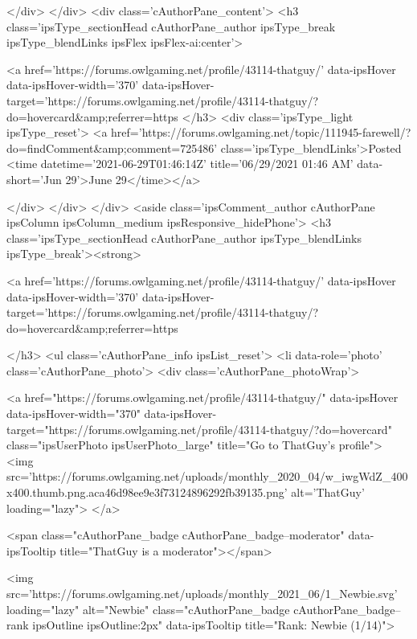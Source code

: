 			</div>
		</div>
		<div class='cAuthorPane_content'>
			<h3 class='ipsType_sectionHead cAuthorPane_author ipsType_break ipsType_blendLinks ipsFlex ipsFlex-ai:center'>
				


<a href='https://forums.owlgaming.net/profile/43114-thatguy/' data-ipsHover data-ipsHover-width='370' data-ipsHover-target='https://forums.owlgaming.net/profile/43114-thatguy/?do=hovercard&amp;referrer=https%
			</h3>
			<div class='ipsType_light ipsType_reset'>
				<a href='https://forums.owlgaming.net/topic/111945-farewell/?do=findComment&amp;comment=725486' class='ipsType_blendLinks'>Posted <time datetime='2021-06-29T01:46:14Z' title='06/29/2021 01:46  AM' data-short='Jun 29'>June 29</time></a>
				
			</div>
		</div>
	</div>
	<aside class='ipsComment_author cAuthorPane ipsColumn ipsColumn_medium ipsResponsive_hidePhone'>
		<h3 class='ipsType_sectionHead cAuthorPane_author ipsType_blendLinks ipsType_break'><strong>


<a href='https://forums.owlgaming.net/profile/43114-thatguy/' data-ipsHover data-ipsHover-width='370' data-ipsHover-target='https://forums.owlgaming.net/profile/43114-thatguy/?do=hovercard&amp;referrer=https%
			
		</h3>
		<ul class='cAuthorPane_info ipsList_reset'>
			<li data-role='photo' class='cAuthorPane_photo'>
				<div class='cAuthorPane_photoWrap'>
					


	<a href="https://forums.owlgaming.net/profile/43114-thatguy/" data-ipsHover data-ipsHover-width="370" data-ipsHover-target="https://forums.owlgaming.net/profile/43114-thatguy/?do=hovercard" class="ipsUserPhoto ipsUserPhoto_large" title="Go to ThatGuy's profile">
		<img src='https://forums.owlgaming.net/uploads/monthly_2020_04/w_iwgWdZ_400x400.thumb.png.aca46d98ee9e3f73124896292fb39135.png' alt='ThatGuy' loading="lazy">
	</a>

					
						<span class="cAuthorPane_badge cAuthorPane_badge--moderator" data-ipsTooltip title="ThatGuy is a moderator"></span>
					
					
						
<img src='https://forums.owlgaming.net/uploads/monthly_2021_06/1_Newbie.svg' loading="lazy" alt="Newbie" class="cAuthorPane_badge cAuthorPane_badge--rank ipsOutline ipsOutline:2px" data-ipsTooltip title="Rank: Newbie (1/14)">
					
